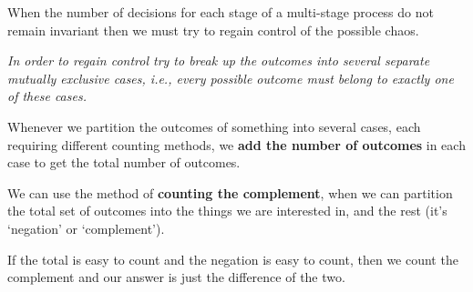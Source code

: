 
\begin{tcolorbox}[title={PST: Mutually Exclusive Cases}, colback={white},colframe={black},sharp corners,colbacktitle={white},coltitle={black},fonttitle=\bfseries,subtitle style={boxrule=0.4pt,colback=white}]		
When the number of decisions for each stage of a multi-stage process do not remain invariant then we must try to regain control of the possible chaos.

\textit{In order to regain control try to break up the outcomes into several separate mutually exclusive cases, i.e., every possible outcome must belong to exactly one of these cases.}
\end{tcolorbox}


\begin{tcolorbox}[title={PST: Partition Leads to Addition}, colback={white},colframe={black},sharp corners,colbacktitle={white},coltitle={black},fonttitle=\bfseries,subtitle style={boxrule=0.4pt,colback=white}]

Whenever we partition the outcomes of something into several cases, each requiring different counting methods, we \textbf{add the number of outcomes} in each case to get the total number of outcomes.
\end{tcolorbox}
  
 
\begin{tcolorbox}[title={PST: Counting the Complement},colback={white},colframe={black},sharp corners,colbacktitle={white},coltitle={black},fonttitle=\bfseries,subtitle style={boxrule=0.4pt,colback=white}]


We can use the method of \textbf{counting the complement}, when we can partition the total set of outcomes into the things we are interested in, and the rest (it's `negation' or `complement'). 
  
If the total is easy to count and the negation is easy to count, then we count the complement and our answer is just the difference of the two.
\end{tcolorbox}

